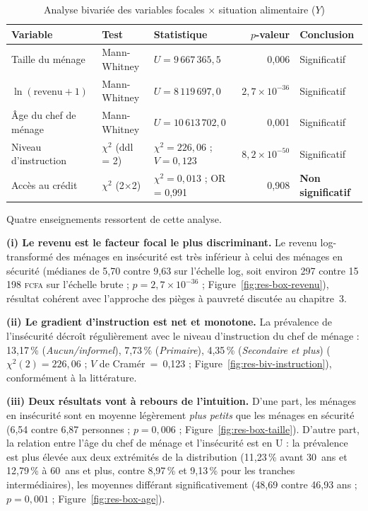 \begin{table}[H]
\centering
\caption{Analyse bivariée des variables focales $\times$ situation alimentaire ($Y$)}
\label{tab:res-bivarie-focales}
\small\setlength{\tabcolsep}{3.5pt}
\begin{tabular}{lllrl}
\toprule
\textbf{Variable} & \textbf{Test} & \textbf{Statistique} & \textbf{$p$-valeur} & \textbf{Conclusion} \\
\midrule
Taille du ménage        & Mann-Whitney & $U = 9\,667\,365{,}5$  & 0,006                 & Significatif \\
$\ln(\text{revenu}+1)$  & Mann-Whitney & $U = 8\,119\,697{,}0$  & $2{,}7\times10^{-36}$ & Significatif \\
Âge du chef de ménage   & Mann-Whitney & $U = 10\,613\,702{,}0$ & 0,001                 & Significatif \\
Niveau d'instruction    & $\chi^2$ (ddl = 2) & $\chi^2 = 226{,}06$ ; $V = 0{,}123$ & $8{,}2\times10^{-50}$ & Significatif \\
Accès au crédit         & $\chi^2$ (2$\times$2) & $\chi^2 = 0{,}013$ ; OR = 0,991 & 0,908 & \textbf{Non significatif} \\
\bottomrule
\end{tabular}
\end{table}

Quatre enseignements ressortent de cette analyse.

\textbf{(i) Le revenu est le facteur focal le plus discriminant.} Le revenu
log-transformé des ménages en insécurité est très inférieur à celui des ménages
en sécurité (médianes de 5,70 contre 9,63 sur l'échelle log, soit environ 297
contre 15\,198 \textsc{fcfa} sur l'échelle brute ;
$p = 2{,}7\times10^{-36}$ ; Figure~\ref{fig:res-box-revenu}), résultat cohérent
avec l'approche des pièges à pauvreté discutée au chapitre~3.

\textbf{(ii) Le gradient d'instruction est net et monotone.} La prévalence de
l'insécurité décroît régulièrement avec le niveau d'instruction du chef de
ménage : 13,17\,\% (\emph{Aucun/informel}), 7,73\,\% (\emph{Primaire}),
4,35\,\% (\emph{Secondaire et plus}) ($\chi^2(2) = 226{,}06$ ;
$V$ de Cramér~=~0,123 ; Figure~\ref{fig:res-biv-instruction}), conformément à
la littérature.

\textbf{(iii) Deux résultats vont à rebours de l'intuition.} D'une part, les
ménages en insécurité sont en moyenne légèrement \emph{plus petits} que les
ménages en sécurité (6,54 contre 6,87 personnes ; $p = 0{,}006$ ;
Figure~\ref{fig:res-box-taille}). D'autre part, la relation entre l'âge du chef
de ménage et l'insécurité est en U : la prévalence est plus élevée aux deux
extrémités de la distribution (11,23\,\% avant 30~ans et 12,79\,\% à 60~ans et
plus, contre 8,97\,\% et 9,13\,\% pour les tranches intermédiaires), les
moyennes différant significativement (48,69 contre 46,93 ans ; $p = 0{,}001$ ;
Figure~\ref{fig:res-box-age}).


